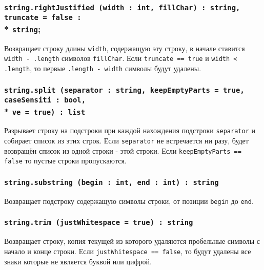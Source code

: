 \subsubsection{\texttt{string.rightJustified (width : int, fillChar) : string, truncate = false :}\\* \texttt{string};}

Возвращает строку длины \texttt{width}, содержащую эту строку, в начале ставится \texttt{width - .length} символов \texttt{fillChar}. Если \texttt{truncate == true} и \texttt{width < .length}, то первые \texttt{.length - width} символы будут удалены.

\subsubsection{\texttt{string.split (separator : string, keepEmptyParts = true, caseSensiti : bool,}\\* \texttt{ve = true) : list}}

Разрывает строку на подстроки при каждой нахождения подстроки \texttt{separator} и собирает список из этих строк. Если \texttt{separator} не встречается ни разу, будет возвращён список из одной строки - этой строки. Если \texttt{keepEmptyParts == false} то пустые строки пропускаются.

\subsubsection{\texttt{string.substring (begin : int, end : int) : string}}

Возвращает подстроку содержащую символы строки, от позиции \texttt{begin} до \texttt{end}.

\subsubsection{\texttt{string.trim (justWhitespace = true) : string}}

Возвращает строку, копия текущей из которого удаляются пробельные символы с начало и конце строки. Если \texttt{justWhitespace == false}, то будут удалены все знаки которые не является буквой или цифрой.


